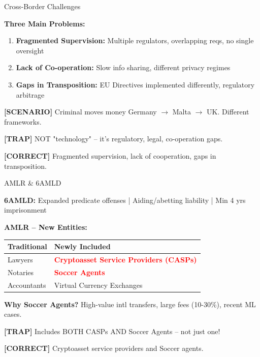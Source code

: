 \documentclass[8pt,aspectratio=169,fontsize=7pt]{beamer}
\renewcommand{\tiny}{\fontsize{4pt}{5pt}\selectfont}
\renewcommand{\normalsize}{\fontsize{8pt}{9pt}\selectfont}
\newcommand{\trap}[1]{%
	\begin{block}{\textcolor{redtrap}{\textbf{[TRAP]}}}
		\textcolor{redtrap}{\tiny #1}
	\end{block}
}
\newcommand{\scenario}[1]{%
	\begin{block}{\textbf{[SCENARIO]}}
		\tiny #1
	\end{block}
}
\newcommand{\correct}[1]{%
	\begin{block}{\textcolor{greencorrect}{\textbf{[CORRECT]}}}
		\textcolor{greencorrect}{\tiny #1}
	\end{block}
}
\begin{document}
	\begin{frame}{\normalsize Cross-Border Challenges}
		
		\textbf{Three Main Problems:}
		
		\begin{enumerate}
			\item \textbf{Fragmented Supervision:} Multiple regulators, overlapping reqs, no single oversight
			\item \textbf{Lack of Co-operation:} Slow info sharing, different privacy regimes
			\item \textbf{Gaps in Transposition:} EU Directives implemented differently, regulatory arbitrage
		\end{enumerate}
		
		\scenario{Criminal moves money Germany $\to$ Malta $\to$ UK. Different frameworks.}
		
		\trap{NOT "technology" -- it's regulatory, legal, co-operation gaps.}
		
		\correct{Fragmented supervision, lack of cooperation, gaps in transposition.}
	\end{frame}
	
	\begin{frame}{\normalsize AMLR \& 6AMLD}
		
		\textbf{6AMLD:} Expanded predicate offenses | Aiding/abetting liability | Min 4 yrs imprisonment
		
		\textbf{AMLR -- New Entities:}
		\begin{table}
			\begin{tabular}{|p{3.8cm}|p{4cm}|}
				\hline
				\textbf{Traditional} & \textbf{Newly Included} \\
				\hline
				Lawyers & \textcolor{red}{\textbf{Cryptoasset Service Providers (CASPs)}} \\
				\hline
				Notaries & \textcolor{red}{\textbf{Soccer Agents}} \\
				\hline
				Accountants & Virtual Currency Exchanges \\
				\hline
			\end{tabular}
		\end{table}
		
		\textbf{Why Soccer Agents?} High-value intl transfers, large fees (10-30\%), recent ML cases.
		
		\trap{Includes BOTH CASPs AND Soccer Agents -- not just one!}
		
		\correct{Cryptoasset service providers and Soccer agents.}
	\end{frame}
	
\end{document}
